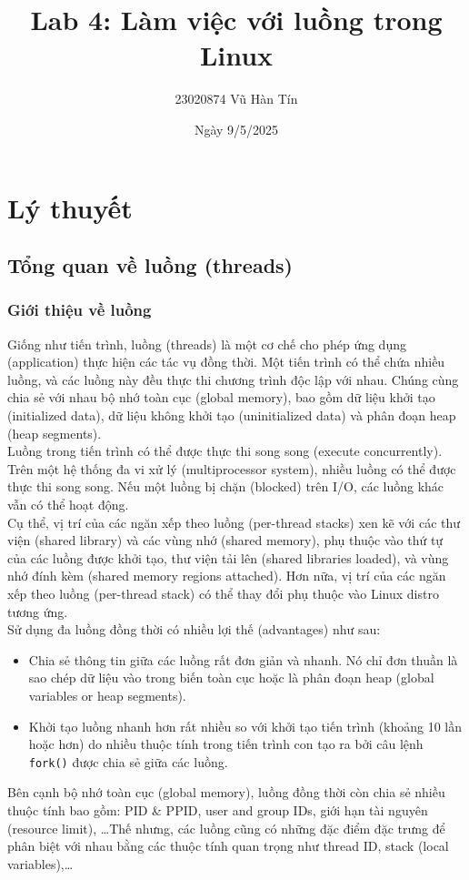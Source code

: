 \documentclass{article}
\title{Lab 4: Làm việc với luồng trong Linux
}
\author{23020874 Vũ Hàn Tín}
\date{Ngày 9/5/2025}
\begin{document}
\maketitle
\section{Lý thuyết}
\subsection{Tổng quan về luồng (threads)}
\subsubsection{Giới thiệu về luồng}
Giống như tiến trình, luồng (threads) là một cơ chế cho phép ứng dụng (application) thực hiện các tác vụ đồng thời.
Một tiến trình có thể chứa nhiều luồng, và các luồng này đều thực thi chương trình độc lập với nhau. Chúng cùng chia sẻ với nhau bộ nhớ toàn cục
(global memory), bao gồm dữ liệu khởi tạo (initialized data), dữ liệu không khởi tạo (uninitialized data) và phân đoạn heap (heap segments).
\\ Luồng trong tiến trình có thể được thực thi song song (execute concurrently). Trên một hệ thống đa vi xử lý (multiprocessor system), nhiều luồng có
thể được thực thi song song. Nếu một luồng bị chặn (blocked) trên I/O, các luồng khác vẫn có thể hoạt động.
\\ Cụ thể, vị trí của các ngăn xếp theo luồng (per-thread stacks) xen kẽ với các thư viện (shared library) và các vùng nhớ (shared memory), phụ thuộc vào
thứ tự của các luồng được khởi tạo, thư viện tải lên (shared libraries loaded), và vùng nhớ đính kèm (shared memory regions attached). Hơn nữa, vị 
trí của các ngăn xếp theo luồng (per-thread stack) có thể thay đổi phụ thuộc vào Linux distro tương ứng.
\\ Sử dụng đa luồng đồng thời có nhiều lợi thế (advantages) như sau:
\begin{itemize}
    \item Chia sẻ thông tin giữa các luồng rất đơn giản và nhanh. Nó chỉ đơn thuần là sao chép dữ liệu vào trong biến toàn cục hoặc là phân đoạn heap (global variables or heap segments).
    \item Khởi tạo luồng nhanh hơn rất nhiều so với khởi tạo tiến trình (khoảng 10 lần hoặc hơn) do
nhiều thuộc tính trong tiến trình con tạo ra bởi câu lệnh \verb|fork()| được chia sẻ giữa các luồng.
\end{itemize}
Bên cạnh bộ nhớ toàn cục (global memory), luồng đồng thời còn chia sẻ nhiều thuộc tính bao gồm: PID \& PPID, user and group IDs, giới hạn tài nguyên (resource limit), \dots Thế nhưng, các luồng cũng
có những đặc điểm đặc trưng để phân biệt với nhau bằng các thuộc tính quan trọng như thread ID, stack (local variables),\dots
\end{document}
